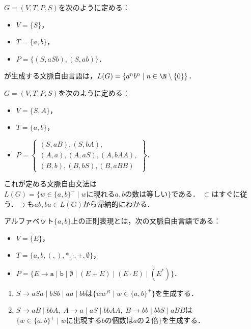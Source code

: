 \begin{example}
        $G=(V,T,P,S)$を次のように定める：
        \begin{itemize}
            \item $V=\{S\}$，
            \item $T=\{a,b\}$，
            \item $P=\{(S,aSb),(S,ab)\}$．
        \end{itemize}
    が生成する文脈自由言語は，$L(G)=\{a^nb^n\mid n\in\N\setminus\{0\}\}$．
\end{example}

\begin{example}
    $G=(V,T,P,S)$を次のように定める：
        \begin{itemize}
            \item $V=\{S,A\}$，
            \item $T=\{a,b\}$，
            \item $P=\left\{\begin{array}{l}
                (S,aB),(S,bA),\\
                (A,a),(A,aS),(A,bAA),\\
                (B,b),(B,bS),(B,aBB)
            \end{array}\right\}$．
        \end{itemize}
    これが定める文脈自由文法は$L(G)=\{w\in\{a,b\}^+\mid wに現れるa,bの数は等しい\}$である．
    $\subset$はすぐに従う．$\supset$も$ab,ba\in L(G)$から帰納的にわかる．
\end{example}

\begin{example}[正則表現]
    アルファベット$\{a,b\}$上の正則表現とは，次の文脈自由言語である：
    \begin{itemize}
        \item $V=\{E\}$，
        \item $T=\{a,b,(,),*,\cdot,+,\emptyset\}$，
        \item $P=\{E\rightarrow\mathtt{a}\mid\mathtt{b}\mid\emptyset\mid(E+E)\mid(E\cdot E)\mid(E^*)\}$．
    \end{itemize}
\end{example}

\begin{example}\mbox{}
    \begin{enumerate}
        \item $S\rightarrow aSa\mid bSb\mid aa\mid bb$は$\{ww^R\mid w\in\{a,b\}^+\}$を生成する．
        \item $S\rightarrow aB\mid bbA,\;A\rightarrow a\mid aS\mid bbAA,\;B\rightarrow bb\mid bbS\mid aBB$は$\{w\in\{a,b\}^+\mid wに出現するbの個数はaの２倍\}$を生成する．
    \end{enumerate}
\end{example}


